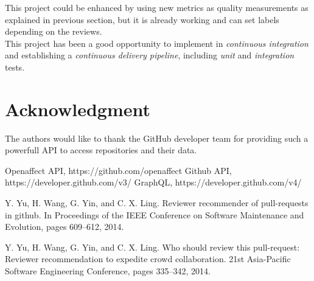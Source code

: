 \documentclass[journal]{IEEEtran}
\begin{document}
This project could be enhanced by using new metrics as quality measurements as explained in previous section, but it is already working and can set labels depending on the reviews.\\

This project has been a good opportunity to implement in \emph{continuous integration} and establishing a \emph{continuous delivery pipeline}, including \emph{unit} and \emph{integration} tests.




\section*{Acknowledgment}
The authors would like to thank the GitHub developer team for providing such a powerfull API to access repositories and their data.





\begin{thebibliography}{1}

Openaffect API, https://github.com/openaffect
Github API, https://developer.github.com/v3/
GraphQL, https://developer.github.com/v4/

\bibitem{}
Y. Yu, H. Wang, G. Yin, and C. X. Ling. Reviewer recommender of pull-requests in github. In Proceedings of the IEEE Conference on Software Maintenance and Evolution, pages 609–612, 2014.

\bibitem{}
Y. Yu, H. Wang, G. Yin, and C. X. Ling. Who should review this pull-request: Reviewer recommendation to expedite crowd collaboration. 21st Asia-Pacific Software Engineering Conference, pages 335–342, 2014.

\end{thebibliography}





\end{document}
